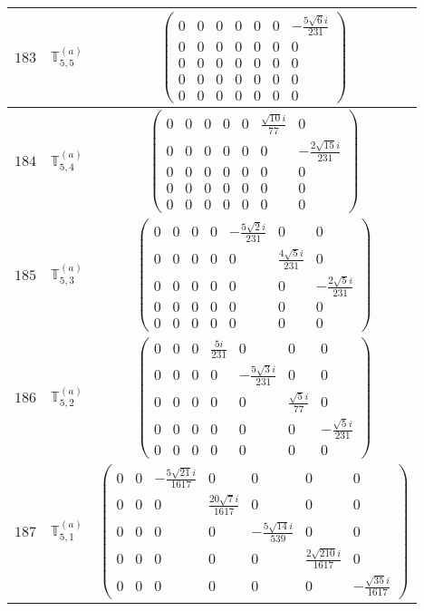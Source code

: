 \documentclass[fleqn,8pt,landscape]{jsarticle}
\begin{document}
\begin{center}
\begin{longtable}{ccc}
$ 183 $ & $ \mathbb{T}_{5,5}^{(a)} $ & $ \begin{pmatrix} 0 & 0 & 0 & 0 & 0 & 0 & - \frac{5 \sqrt{6} i}{231} \\ 0 & 0 & 0 & 0 & 0 & 0 & 0 \\ 0 & 0 & 0 & 0 & 0 & 0 & 0 \\ 0 & 0 & 0 & 0 & 0 & 0 & 0 \\ 0 & 0 & 0 & 0 & 0 & 0 & 0 \end{pmatrix} $ \\ \hline
$ 184 $ & $ \mathbb{T}_{5,4}^{(a)} $ & $ \begin{pmatrix} 0 & 0 & 0 & 0 & 0 & \frac{\sqrt{10} i}{77} & 0 \\ 0 & 0 & 0 & 0 & 0 & 0 & - \frac{2 \sqrt{15} i}{231} \\ 0 & 0 & 0 & 0 & 0 & 0 & 0 \\ 0 & 0 & 0 & 0 & 0 & 0 & 0 \\ 0 & 0 & 0 & 0 & 0 & 0 & 0 \end{pmatrix} $ \\ \hline
$ 185 $ & $ \mathbb{T}_{5,3}^{(a)} $ & $ \begin{pmatrix} 0 & 0 & 0 & 0 & - \frac{5 \sqrt{2} i}{231} & 0 & 0 \\ 0 & 0 & 0 & 0 & 0 & \frac{4 \sqrt{5} i}{231} & 0 \\ 0 & 0 & 0 & 0 & 0 & 0 & - \frac{2 \sqrt{5} i}{231} \\ 0 & 0 & 0 & 0 & 0 & 0 & 0 \\ 0 & 0 & 0 & 0 & 0 & 0 & 0 \end{pmatrix} $ \\ \hline
$ 186 $ & $ \mathbb{T}_{5,2}^{(a)} $ & $ \begin{pmatrix} 0 & 0 & 0 & \frac{5 i}{231} & 0 & 0 & 0 \\ 0 & 0 & 0 & 0 & - \frac{5 \sqrt{3} i}{231} & 0 & 0 \\ 0 & 0 & 0 & 0 & 0 & \frac{\sqrt{5} i}{77} & 0 \\ 0 & 0 & 0 & 0 & 0 & 0 & - \frac{\sqrt{5} i}{231} \\ 0 & 0 & 0 & 0 & 0 & 0 & 0 \end{pmatrix} $ \\ \hline
$ 187 $ & $ \mathbb{T}_{5,1}^{(a)} $ & $ \begin{pmatrix} 0 & 0 & - \frac{5 \sqrt{21} i}{1617} & 0 & 0 & 0 & 0 \\ 0 & 0 & 0 & \frac{20 \sqrt{7} i}{1617} & 0 & 0 & 0 \\ 0 & 0 & 0 & 0 & - \frac{5 \sqrt{14} i}{539} & 0 & 0 \\ 0 & 0 & 0 & 0 & 0 & \frac{2 \sqrt{210} i}{1617} & 0 \\ 0 & 0 & 0 & 0 & 0 & 0 & - \frac{\sqrt{35} i}{1617} \end{pmatrix} $ \\ \hline

\end{longtable}
\end{center}
\end{document}
